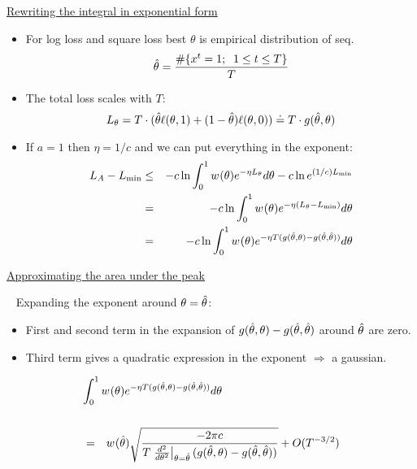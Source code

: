 \begin{flushleft}
\begin{LARGE}
\pagebreak
\begin{center}
\underline{Rewriting the integral in exponential form}
\end{center}
\begin{itemize}
\item
For log loss and square loss best $\theta$ is empirical distribution
of seq.
\[
	\hat{\theta} = {\#\{x^t=1;\;\; 1 \leq t \leq T \} \over T} 
\]
\item
The total loss scales with $T$:
\[
L_{\theta} =
 T \cdot (\hat{\theta} \ell(\theta,1) + (1-\hat{\theta})\ell(\theta,0))
 \doteq T \cdot g(\hat{\theta},\theta)
\]
\item
If $a=1$ then $\eta=1/c$ and we can put everything in the exponent:
\begin{eqnarray*}
L_A - L_{\min} &\leq&
-c \ln \int_0^1 w^{}(\theta) e^{-\eta L_{\theta}} d\theta
-c \ln e^{(1/c) L_{\min}} \\
&=&
-c \ln \int_0^1 w^{}(\theta) e^{-\eta
(L_{\theta}-L_{\min})} d\theta \\
&=&
-c \ln \int_0^1 w^{}(\theta) 
e^{-\eta T (g(\hat{\theta},\theta) - g(\hat{\theta},\hat{\theta}))} d\theta \\
\end{eqnarray*}
\end{itemize}
\pagebreak
\begin{center}
\underline{Approximating the area under the peak}
\end{center}
~\newline
Expanding the exponent around $\theta=\hat{\theta}$:
\begin{itemize}
\item
First and second term in the expansion of
$g(\hat{\theta},\theta)-g(\hat{\theta},\hat{\theta})$ around $\hat{\theta}$ are zero.
\item
Third term gives a quadratic expression in the exponent \newline
$\Rightarrow$ a gaussian.
\end{itemize}

\begin{eqnarray*}
\lefteqn{\int_0^1  \dweight{\theta}{} 
         e^{-\eta T (g(\btheta,\theta)-g(\btheta,\btheta))} d\theta}\\
\\
&=& \dweight{\btheta}{} \sqrt{-2 \pi c \over 
T \left. {d^2 \over d\theta^2} \right|_{\theta=\btheta} 
(g(\btheta,\theta)-g(\btheta,\btheta))}
+ O(T^{-3/2})
\end{eqnarray*}


\end{LARGE}
\end{flushleft}
